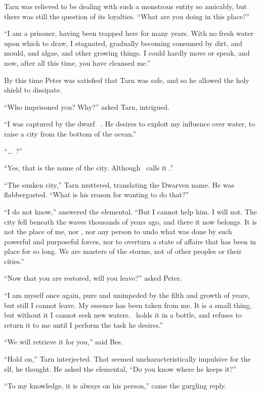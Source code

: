 Tarn was relieved to be dealing with such a monstrous entity so amicably, but there was still the question of its loyalties. ``What are you doing in this place?''  

``I am a prisoner, having been trapped here for many years.  With no fresh water upon which to draw, I stagnated, gradually becoming consumed by dirt, and mould, and algae, and other growing things.  I could hardly move or speak, and now, after all this time, you have cleansed me.''

By this time Peter was satisfied that Tarn was safe, and so he allowed the holy shield to dissipate.

``Who imprisoned you?  Why?''  asked Tarn, intrigued.

``I was captured by the dwarf \mothzam\ \driktur.  He desires to exploit my influence over water, to raise a city from the bottom of the ocean.''

``\ldots\ \atmudarant?''

``Yes, that is the name of the city.  Although \mothzam\ calls it \valdunmir.''

``The sunken city,'' Tarn muttered, translating the Dwarven name.  He was flabbergasted. ``What is his reason for wanting to do that?''

``I do not know,'' answered the elemental.  ``But I cannot help him.  I will not.  The city fell beneath the waves thousands of years ago, and there it now belongs.  It is not the place of me, nor \mothzam, nor any person to undo what was done by such powerful and purposeful forces, nor to overturn a state of affairs that has been in place for so long.  We are masters of the storms, not of other peoples or their cities.''

``Now that you are restored, will you leave?'' asked Peter.

``I am myself once again, pure and unimpeded by the filth and growth of years, but still I cannot leave.  My essence has been taken from me.  It is a small thing, but without it I cannot seek new waters.  \mothzam\ holds it in a bottle, and refuses to return it to me until I perform the task he desires.''

``We will retrieve it for you,'' said Bes.

``Hold on,'' Tarn interjected.  That seemed uncharacteristically impulsive for the elf, he thought.  He asked the elemental, ``Do you know where he keeps it?''

``To my knowledge, it is always on his person,'' came the gurgling reply.

